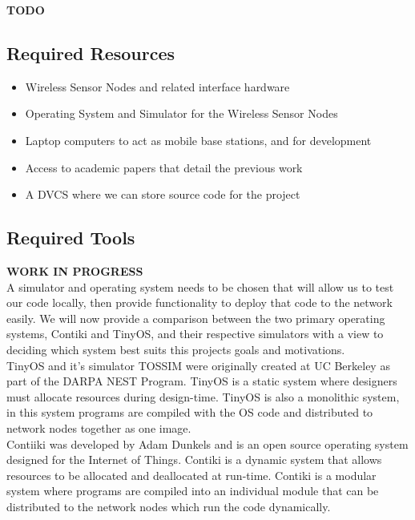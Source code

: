 \documentclass[a4paper]{article}
\begin{document}
\textbf{TODO}

\subsection{Required Resources}
\begin{itemize}
	\item Wireless Sensor Nodes and related interface hardware
	\item Operating System and Simulator for the Wireless Sensor Nodes
	\item Laptop computers to act as mobile base stations, and for development
	\item Access to academic papers that detail the previous work
	\item A DVCS where we can store source code for the project
\end{itemize}

\subsection{Required Tools}
\textbf{WORK IN PROGRESS}\\

A simulator and operating system needs to be chosen that will allow us to test our code locally, then provide functionality to deploy that code to the network easily. We will now provide a comparison between the two primary operating systems, Contiki\cite{23839452} and TinyOS\cite{levis2003tossim}, and their respective simulators with a view to deciding which system best suits this projects goals and motivations.\\

TinyOS and it's simulator TOSSIM were originally created at UC Berkeley as part of the DARPA NEST Program. TinyOS is a static system where designers must allocate resources during design-time. TinyOS is also a monolithic system, in this system programs are compiled with the OS code and distributed to network nodes together as one image.\\

Contiiki was developed by Adam Dunkels and is an open source operating system designed for the Internet of Things. Contiki is a dynamic system that allows resources to be allocated and deallocated at run-time. Contiki is a modular system where programs are compiled into an individual module that can be distributed to the network nodes which run the code dynamically.\\
\end{document}
